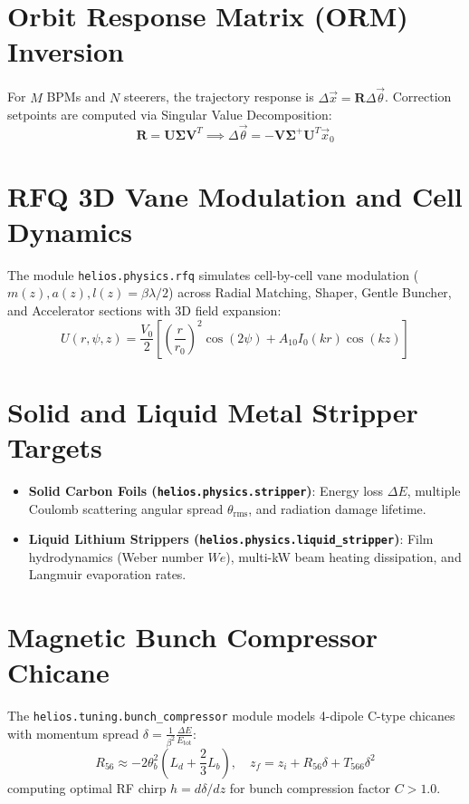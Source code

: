 \documentclass[11pt,a4paper]{report}
\begin{document}
\section{Orbit Response Matrix (ORM) Inversion}
For $M$ BPMs and $N$ steerers, the trajectory response is $\Delta \vec{x} = \mathbf{R} \Delta \vec{\theta}$. Correction setpoints are computed via Singular Value Decomposition:
\begin{equation}
    \mathbf{R} = \mathbf{U} \mathbf{\Sigma} \mathbf{V}^T \implies \Delta \vec{\theta} = -\mathbf{V} \mathbf{\Sigma}^+ \mathbf{U}^T \vec{x}_0
\end{equation}

\section{RFQ 3D Vane Modulation and Cell Dynamics}
The module \texttt{helios.physics.rfq} simulates cell-by-cell vane modulation ($m(z), a(z), l(z)=\beta\lambda/2$) across Radial Matching, Shaper, Gentle Buncher, and Accelerator sections with 3D field expansion:
\begin{equation}
    U(r, \psi, z) = \frac{V_0}{2} \left[ \left(\frac{r}{r_0}\right)^2 \cos(2\psi) + A_{10} I_0(k r) \cos(k z) \right]
\end{equation}

\section{Solid and Liquid Metal Stripper Targets}
\begin{itemize}
    \item \textbf{Solid Carbon Foils (\texttt{helios.physics.stripper})}: Energy loss $\Delta E$, multiple Coulomb scattering angular spread $\theta_{\text{rms}}$, and radiation damage lifetime.
    \item \textbf{Liquid Lithium Strippers (\texttt{helios.physics.liquid\_stripper})}: Film hydrodynamics (Weber number $We$), multi-kW beam heating dissipation, and Langmuir evaporation rates.
\end{itemize}

\section{Magnetic Bunch Compressor Chicane}
The \texttt{helios.tuning.bunch\_compressor} module models 4-dipole C-type chicanes with momentum spread $\delta = \frac{1}{\beta^2} \frac{\Delta E}{E_{\text{tot}}}$:
\begin{equation}
    R_{56} \approx -2 \theta_b^2 \left( L_d + \frac{2}{3} L_b \right), \quad z_f = z_i + R_{56} \delta + T_{566} \delta^2
\end{equation}
computing optimal RF chirp $h = d\delta/dz$ for bunch compression factor $C > 1.0$.
\end{document}
